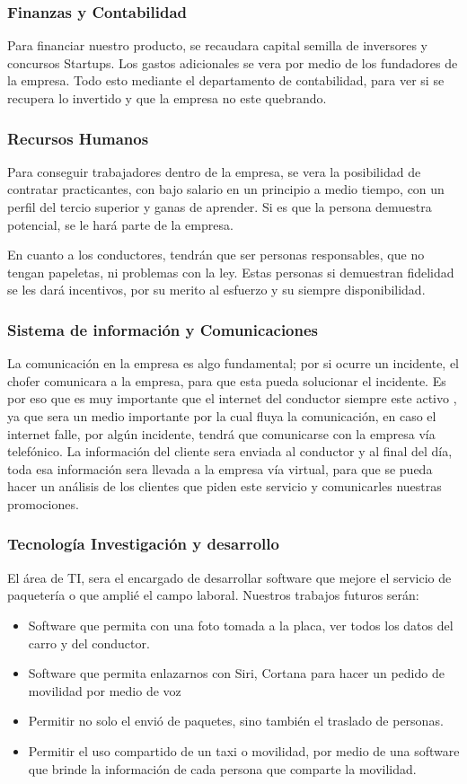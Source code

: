 \subsubsection{Finanzas y Contabilidad}
Para financiar nuestro producto, se recaudara capital semilla de inversores y concursos Startups. Los gastos adicionales se vera por medio de los fundadores de la empresa. Todo esto mediante el departamento de contabilidad, para ver si se recupera lo invertido y que la empresa no este quebrando.

\subsubsection{Recursos Humanos}
Para conseguir trabajadores dentro de la empresa, se vera la posibilidad de contratar practicantes, con bajo salario en un principio a medio tiempo, con un perfil del tercio superior y ganas de aprender. Si es que la persona demuestra potencial, se le hará parte de la empresa.

En cuanto a los conductores, tendrán que ser personas responsables, que no tengan papeletas, ni problemas con la ley. Estas personas si demuestran fidelidad se les dará incentivos, por su merito al esfuerzo y su siempre disponibilidad.

\subsubsection{Sistema de información y Comunicaciones}
La comunicación en la empresa es algo fundamental; por si ocurre un incidente, el chofer comunicara a la empresa, para que esta pueda solucionar el incidente. Es por eso que es muy importante que el internet del conductor siempre este activo , ya que sera un medio importante por la cual fluya la comunicación, en caso el internet falle, por algún incidente, tendrá que comunicarse con la empresa vía telefónico.
La información del cliente sera enviada al conductor y al final del día, toda esa información sera llevada a la empresa vía virtual, para que se pueda hacer un análisis de los clientes que piden este servicio y comunicarles nuestras promociones.


\subsubsection{Tecnología Investigación y desarrollo}
El área de TI, sera el encargado de desarrollar software que mejore el servicio de paquetería o que amplié el campo laboral. Nuestros trabajos futuros serán:
\begin{itemize}
\item Software que permita con una foto tomada a la placa, ver todos los datos del carro y del conductor.
\item Software que permita enlazarnos con Siri, Cortana para hacer un pedido de movilidad por medio de voz
\item Permitir no solo el envió de paquetes, sino también el traslado de personas.
\item Permitir el uso compartido de un taxi o movilidad, por medio de una software que brinde la información de cada persona que comparte la movilidad.
\end{itemize}

